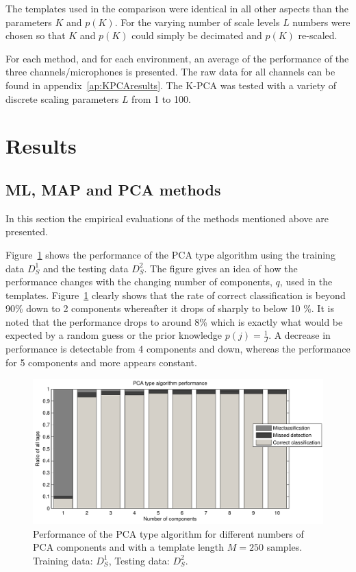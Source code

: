 The templates used in the comparison were identical in all other aspects than the parameters $K$ and $p(K)$. For the varying number of scale levels $L$ numbers were chosen so that $K$ and $p(K)$ could simply be decimated and $p(K)$ re-scaled.

For each method, and for each environment, an average of the performance of the three channels/microphones is presented. The raw data for all channels can be found in appendix~\ref{ap:KPCAresults}. The K-PCA was tested with a variety of discrete scaling parameters $L$ from 1 to 100.

\section{Results}\label{sec:results}
\subsection{ML, MAP and PCA methods}
In this section the empirical evaluations of the methods mentioned above are presented.

Figure~\ref{fig:PCAperform} shows the performance of the PCA type algorithm using the training data $D^1_S$ and the testing data $D^2_S$. The figure gives an idea of how the performance changes with the changing number of components, $q$, used in the templates. Figure~\ref{fig:PCAperform} clearly shows that the rate of correct classification is beyond 90\% down to 2 components whereafter it drops of sharply to below 10 \%. It is noted that the performance drops to around 8\% which is exactly what would be expected by a random guess or the prior knowledge $p(j)= \frac{1}{J}$. A decrease in performance is detectable from 4 components and down, whereas the performance for 5 components and more appears constant.

\begin{figure}[!] %
\centering
\includegraphics[width=150mm]{PCAperform.pdf}
\caption{Performance of the PCA type algorithm for different numbers of PCA components and with a template length $M=250$ samples. Training data: $D^1_S$, Testing data: $D^2_S$.}\label{fig:PCAperform}
\end{figure}


